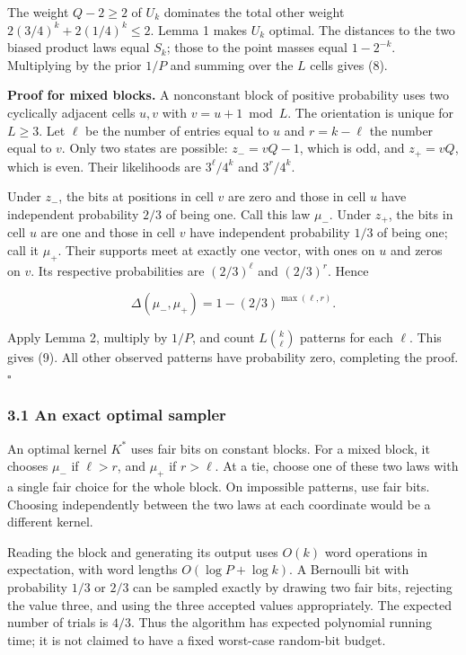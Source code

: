 \documentclass[
]{article}
\begin{document}
The weight \(Q-2\ge2\) of \(U_k\) dominates the total other weight
\(2(3/4)^k+2(1/4)^k\le2\). Lemma 1 makes \(U_k\) optimal. The distances
to the two biased product laws equal \(S_k\); those to the point masses
equal \(1-2^{-k}\). Multiplying by the prior \(1/P\) and summing over
the \(L\) cells gives (8).

\textbf{Proof for mixed blocks.} A nonconstant block of positive
probability uses two cyclically adjacent cells \(u,v\) with
\(v=u+1\bmod L\). The orientation is unique for \(L\ge3\). Let \(\ell\)
be the number of entries equal to \(u\) and \(r=k-\ell\) the number
equal to \(v\). Only two states are possible: \(z_-=vQ-1\), which is
odd, and \(z_+=vQ\), which is even. Their likelihoods are \(3^\ell/4^k\)
and \(3^r/4^k\).

Under \(z_-\), the bits at positions in cell \(v\) are zero and those in
cell \(u\) have independent probability \(2/3\) of being one. Call this
law \(\mu_-\). Under \(z_+\), the bits in cell \(u\) are one and those
in cell \(v\) have independent probability \(1/3\) of being one; call it
\(\mu_+\). Their supports meet at exactly one vector, with ones on \(u\)
and zeros on \(v\). Its respective probabilities are \((2/3)^\ell\) and
\((2/3)^r\). Hence

\[
\Delta(\mu_-,\mu_+)=1-(2/3)^{\max(\ell,r)}.
\tag{10}
\]

Apply Lemma 2, multiply by \(1/P\), and count \(L\binom{k}{\ell}\)
patterns for each \(\ell\). This gives (9). All other observed patterns
have probability zero, completing the proof. \(\square\)

\subsubsection{3.1 An exact optimal
sampler}\label{an-exact-optimal-sampler}

An optimal kernel \(K^*\) uses fair bits on constant blocks. For a mixed
block, it chooses \(\mu_-\) if \(\ell>r\), and \(\mu_+\) if \(r>\ell\).
At a tie, choose one of these two laws with a single fair choice for the
whole block. On impossible patterns, use fair bits. Choosing
independently between the two laws at each coordinate would be a
different kernel.

Reading the block and generating its output uses \(O(k)\) word
operations in expectation, with word lengths \(O(\log P+\log k)\). A
Bernoulli bit with probability \(1/3\) or \(2/3\) can be sampled exactly
by drawing two fair bits, rejecting the value three, and using the three
accepted values appropriately. The expected number of trials is \(4/3\).
Thus the algorithm has expected polynomial running time; it is not
claimed to have a fixed worst-case random-bit budget.
\end{document}
